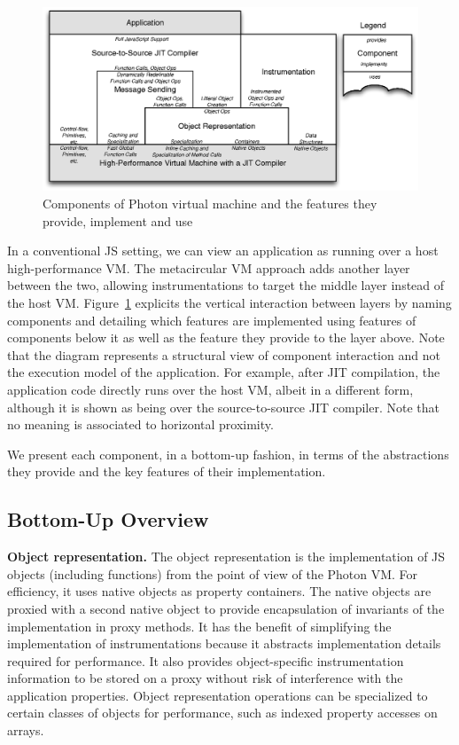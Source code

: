 \begin{figure}[htb]
\begin{center}
\includegraphics[width=1.0\textwidth]{figures/architecture}
\caption{\label{fig:Architecture} Components of Photon virtual machine
and the features they provide, implement and use}
\end{center}
\end{figure}

In a conventional JS setting, we can view an application as running over a host
high-performance VM. The metacircular VM approach adds another layer between
the two, allowing instrumentations to target the middle layer instead of the
host VM.  Figure~\ref{fig:Architecture} explicits the vertical interaction
between layers by naming components and detailing which features are
implemented using features of components below it as well as the feature they
provide to the layer above. Note that the diagram represents a structural view
of component interaction and not the execution model of the application. For
example, after JIT compilation, the application code directly runs over the
host VM, albeit in a different form, although it is shown as being over the
source-to-source JIT compiler.  Note that no meaning is associated to
horizontal proximity.

We present each component, in a bottom-up fashion, in terms of the abstractions
they provide and the key features of their implementation. 

\subsection{Bottom-Up Overview}

\textbf{Object representation.} The object representation is the implementation
of JS objects (including functions) from the point of view of the Photon VM.
For efficiency, it uses native objects as property containers. The native
objects are proxied with a second native object to provide encapsulation of
invariants of the implementation in proxy methods. It has the benefit of
simplifying the implementation of instrumentations because it abstracts
implementation details required for performance. It also provides object-specific
instrumentation information to be stored on a proxy without risk of
interference with the application properties.  Object representation operations
can be specialized to certain classes of objects for performance, such as
indexed property accesses on arrays.

